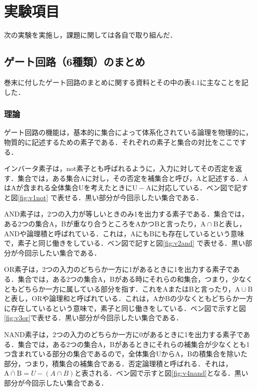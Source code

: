 %
%
%
\section{実験項目}
\label{experiment}
次の実験を実施し，課題に関しては各自で取り組んだ．

%
%
%
\subsection{ゲート回路（6種類）のまとめ}
\label{experiment_kairomatome}
巻末に付したゲート回路のまとめに関する資料とその中の表$4.1$に主なことを記した．
\subsubsection{理論}
\label{kairomatome_riron}
ゲート回路の機能は，基本的に集合によって体系化されている論理を物理的に，物質的に記述するための素子である．それぞれの素子と集合の対比をここでする．

インバータ素子は，not素子とも呼ばれるように，入力に対してその否定を返す．集合では，ある集合Aに対し，その否定を補集合と呼び，$\overline{\mathrm{A}}$と記述する．$\overline{\mathrm{A}}$はAが含まれる全体集合Uを考えたときに$\mathrm{U}-\mathrm{A}$に対応している．ベン図で記すと図\ref{fig:v1not} で表せる．黒い部分が今回示したい集合である．

AND素子は，2つの入力が等しいときのみ1を出力する素子である．集合では，ある2つの集合A，Bが重なり合うところをAかつBと言ったり，$\mathrm{A}\cap\mathrm{B}$と表し，ANDや論理積と呼ばれている．これは，AにもBにも存在しているという意味で，素子と同じ働きをしている．ベン図で記すと図\ref{fig:v2and} で表せる．黒い部分が今回示したい集合である．

OR素子は，2つの入力のどちらか一方に1があるときに1を出力する素子である．集合では，ある2つの集合A，Bがある時にそれらの和集合，つまり，少なくともどちらか一方に属している部分を指す．これをAまたはBと言ったり，$\mathrm{A}\cup\mathrm{B}$と表し，ORや論理和と呼ばれている．これは，AかBの少なくともどちらか一方に存在しているという意味で，素子と同じ働きをしている．ベン図で示すと図\ref{fig:v3or}で表せる．黒い部分が今回示したい集合である．

NAND素子は，2つの入力のどちらか一方に0があるときに1を出力する素子である．集合では，ある2つの集合A，Bがあるときにそれらの補集合が少なくとも1つ含まれている部分の集合であるので，全体集合UからA，Bの積集合を除いた部分，つまり，積集合の補集合である．否定論理積と呼ばれる．それは，$\overline{\mathrm{A}\cap\mathrm{B}}=U-(A\cap B)$と表される．ベン図で示すと図\ref{fig:v4nand}となる．黒い部分が今回示したい集合である．

